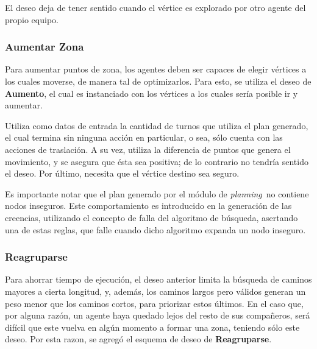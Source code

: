 \documentclass[oneside]{book}
\theoremstyle{definition}
\theoremstyle{example}
\begin{document}
El deseo deja de tener sentido cuando el vértice es explorado por otro agente del propio
equipo. 

% 

\subsubsection{Aumentar Zona}

Para aumentar puntos de zona, los agentes deben ser capaces de elegir vértices a los 
cuales moverse, de manera tal de optimizarlos. Para esto, se utiliza el deseo de 
\textbf{Aumento}, el cual es instanciado con los vértices a los cuales sería posible ir y 
aumentar. 

Utiliza como datos de entrada la cantidad de turnos que utiliza el plan generado, el 
cual termina sin ninguna acción en particular, o sea, sólo cuenta con las acciones 
de traslación. A su vez, utiliza la diferencia de puntos que genera el movimiento, y 
se asegura que ésta sea positiva; de lo contrario no tendría sentido el deseo. Por 
último, necesita que el vértice destino sea seguro.

Es importante notar que el plan generado por el módulo de \textit{planning}\ no contiene
nodos inseguros. Este comportamiento es introducido en la generación de las creencias,
utilizando el concepto de falla del algoritmo de búsqueda, asertando una de estas reglas,
que falle cuando dicho algoritmo expanda un nodo inseguro.


\subsubsection{Reagruparse}

Para ahorrar tiempo de ejecución, el deseo anterior limita la búsqueda de caminos mayores
a cierta longitud, y, además, los caminos largos pero válidos generan un peso menor que 
los caminos cortos, para priorizar estos últimos. En el caso que, por alguna razón, un 
agente haya quedado lejos del resto de sus compañeros, será difícil que este vuelva en 
algún momento a formar una zona, teniendo sólo este deseo. Por esta razon, se agregó el
esquema de deseo de \textbf{Reagruparse}.
\end{document}
